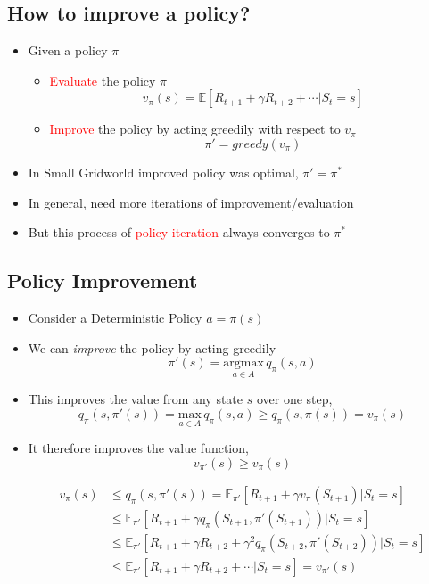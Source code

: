 \documentclass[varwidth]{article}
\begin{document}
\subsection{How to improve a policy?}
\begin{itemize}
    \item Given a policy $\pi$
    \begin{itemize}
        \item \textcolor{red}{Evaluate} the policy $\pi$
        $$ v_\pi(s) = \mathbb{E}[R_{t+1} + \gamma R_{t+2} + \cdots | S_t = s] $$
        \item \textcolor{red}{Improve} the policy by acting greedily with respect to $v_\pi$
        $$\pi' = greedy(v_\pi)$$
    \end{itemize}
    \item In Small Gridworld improved policy was optimal, $\pi' = \pi^*$
    \item In general, need more iterations of improvement/evaluation
    \item But this process of \textcolor{red}{policy iteration} always converges to $\pi^*$
\end{itemize}
\subsection{Policy Improvement}
\begin{itemize}
    \item Consider a Deterministic Policy $ a = \pi(s) $
    \item We can \textit{improve} the policy by acting greedily
    $$ \pi'(s) = \underset{a\in A}{\mathrm{argmax}}\, q_{\pi}(s,a) $$
    \item This improves the value from any state $s$ over one step,
    $$ q_{\pi}(s,\pi'(s)) = \underset{a \in A}{\mathrm{max}}\, q_{\pi}(s,a) \ge q_{\pi}(s,\pi(s)) = v_{\pi}(s)   $$
   

    \item It therefore improves the value function,
    $$v_{\pi'}(s) \ge v_{\pi}(s)$$

    \begin{align*}
        v_{\pi}(s) &\leq q_{\pi}(s,\pi'(s)) = \mathbb{E} _{\pi'}[R_{t+1} + \gamma v_\pi (S_{t+1}) |S_t = s]\\
        &\leq \mathbb{E}_{\pi'} [R_{t+1} + \gamma q_\pi(S_{t+1}, \pi'(S_{t+1})) | S_t = s] \\
        &\leq \mathbb{E}_{\pi'} [R_{t+1} + \gamma R_{t+2} + \gamma^2 q_\pi (S_{t+2}, \pi'(S_{t+2})) | S_t = s ] \\
        &\leq \mathbb{E}_{\pi'} [R_{t+1} + \gamma R_{t+2} + \cdots | S_t = s ] = v_{\pi'}(s)
    \end{align*}
\end{itemize}
\end{document}
